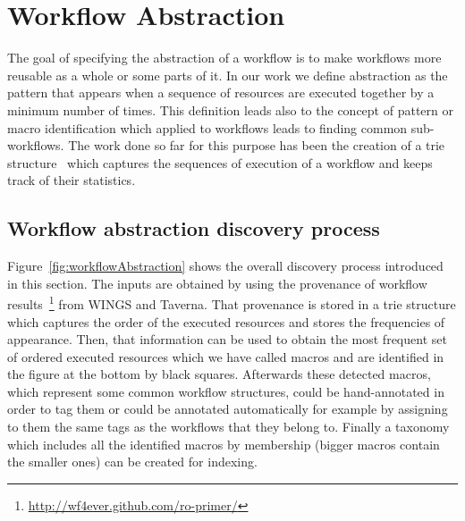 \section{Workflow Abstraction}

\label{sec:abstraction}


The goal of specifying the abstraction of a workflow is to make workflows more reusable as a whole or some parts of it. In our work we define abstraction as the pattern that appears when a sequence of resources are executed together by a minimum number of times. This definition leads also to the concept of pattern or macro identification which applied to workflows leads to finding common sub-workflows. The work done so far for this purpose has been the creation of a trie structure~\cite{knuth11} which captures the sequences of execution of a workflow and keeps track of their statistics. 


\subsection{Workflow abstraction discovery process}
Figure~\ref{fig:workflowAbstraction} shows the overall discovery process introduced in this section. The inputs are obtained by using the provenance of workflow results~\footnote{\url{http://wf4ever.github.com/ro-primer/}} from WINGS and Taverna. That provenance is stored in a trie structure which captures the order of the executed resources and stores the frequencies of appearance. Then, that information can be used to obtain the most frequent set of ordered executed resources which we have called macros and are identified in the figure at the bottom by black squares. Afterwards these detected macros, which represent some common workflow structures, could be hand-annotated in order to tag them or could be annotated automatically for example by assigning to them the same tags as the workflows that they belong to. Finally a taxonomy which includes all the identified macros by membership (bigger macros contain the smaller ones) can be created for indexing.

